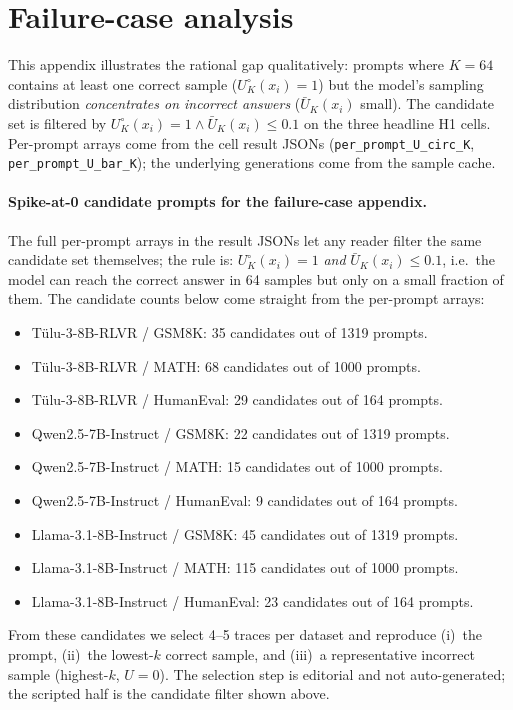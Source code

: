 \section{Failure-case analysis}
\label{app:failures}

This appendix illustrates the rational gap qualitatively: prompts where
$K{=}64$ contains at least one correct sample
($U^\circ_K(x_i) = 1$) but the model's sampling distribution
\emph{concentrates on incorrect answers} ($\bar U_K(x_i)$ small).
The candidate set is filtered by
$U^\circ_K(x_i)=1 \land \bar U_K(x_i) \le 0.1$ on the three headline
H1 cells. Per-prompt arrays come from the cell result JSONs
(\texttt{per\_prompt\_U\_circ\_K}, \texttt{per\_prompt\_U\_bar\_K});
the underlying generations come from the sample cache.

\paragraph{Spike-at-0 candidate prompts for the failure-case appendix.} The full per-prompt arrays in the result JSONs let any reader filter the same candidate set themselves; the rule is:
$U^\circ_K(x_i)=1$ \emph{and} $\bar U_K(x_i) \le 0.1$, i.e.\ the model can reach the correct answer in 64 samples but only on a small fraction of them. The candidate counts below come straight from the per-prompt arrays:
\begin{itemize}
  \item Tülu-3-8B-RLVR / GSM8K: 35 candidates out of 1319 prompts.
  \item Tülu-3-8B-RLVR / MATH: 68 candidates out of 1000 prompts.
  \item Tülu-3-8B-RLVR / HumanEval: 29 candidates out of 164 prompts.
  \item Qwen2.5-7B-Instruct / GSM8K: 22 candidates out of 1319 prompts.
  \item Qwen2.5-7B-Instruct / MATH: 15 candidates out of 1000 prompts.
  \item Qwen2.5-7B-Instruct / HumanEval: 9 candidates out of 164 prompts.
  \item Llama-3.1-8B-Instruct / GSM8K: 45 candidates out of 1319 prompts.
  \item Llama-3.1-8B-Instruct / MATH: 115 candidates out of 1000 prompts.
  \item Llama-3.1-8B-Instruct / HumanEval: 23 candidates out of 164 prompts.
\end{itemize}

From these candidates we select 4--5 traces per dataset and reproduce
(i)~the prompt, (ii)~the lowest-$k$ correct sample, and
(iii)~a representative incorrect sample (highest-$k$, $U=0$). The
selection step is editorial and not auto-generated; the scripted half
is the candidate filter shown above.
